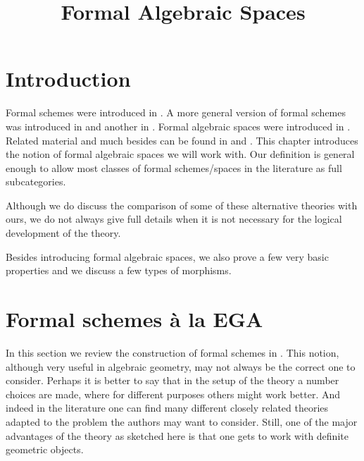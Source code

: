 

%


\title{Formal Algebraic Spaces}


\maketitle

\label{section-phantom}

\tableofcontents

\section{Introduction}
\label{section-introduction}

\noindent
Formal schemes were introduced in \cite{EGA}. A more general version
of formal schemes was introduced in \cite{McQuillan} and another
in \cite{Yasuda}. Formal algebraic spaces were introduced in \cite{Kn}.
Related material and much besides can be found in
\cite{Abbes} and \cite{Fujiwara-Kato}.
This chapter introduces the notion of formal algebraic spaces
we will work with. Our definition is general enough to allow most
classes of formal schemes/spaces in the literature as full subcategories.

\medskip\noindent
Although we do discuss the comparison of some of these alternative theories
with ours, we do not always give full details when it is not necessary for
the logical development of the theory.

\medskip\noindent
Besides introducing formal algebraic spaces, we also prove a few very
basic properties and we discuss a few types of morphisms.










\section{Formal schemes \`a la EGA}
\label{section-formal-schemes-EGA}

\noindent
In this section we review the construction of formal schemes in \cite{EGA}.
This notion, although very useful in algebraic geometry,
may not always be the correct one to consider. Perhaps it is better to say
that in the setup of the theory a number choices are made, where for
different purposes others might work better. And indeed in the literature
one can find many different closely related theories
adapted to the problem the authors may want to consider. Still, one
of the major advantages of the theory as sketched here is that one
gets to work with definite geometric objects.

